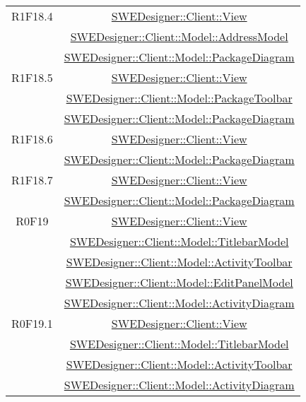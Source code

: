 \documentclass[../SpecificaTecnica.tex]{subfiles}
\begin{document}
\begin{longtable}{|c|c|}
		R1F18.4 & \hyperlink{SWEDesigner::Client::View}{SWEDesigner::Client::View} \\& \hyperlink{SWEDesigner::Client::Model::AddressModel}{SWEDesigner::Client::Model::AddressModel} \\& \hyperlink{SWEDesigner::Client::Model::PackageDiagram}{SWEDesigner::Client::Model::PackageDiagram}\\\hline
		R1F18.5 & \hyperlink{SWEDesigner::Client::View}{SWEDesigner::Client::View} \\& \hyperlink{SWEDesigner::Client::Model::PackageToolbar}{SWEDesigner::Client::Model::PackageToolbar} \\& \hyperlink{SWEDesigner::Client::Model::PackageDiagram}{SWEDesigner::Client::Model::PackageDiagram} \\\hline
		R1F18.6 & \hyperlink{SWEDesigner::Client::View}{SWEDesigner::Client::View} \\& \hyperlink{SWEDesigner::Client::Model::PackageDiagram}{SWEDesigner::Client::Model::PackageDiagram} \\\hline
		R1F18.7 & \hyperlink{SWEDesigner::Client::View}{SWEDesigner::Client::View} \\& \hyperlink{SWEDesigner::Client::Model::PackageDiagram}{SWEDesigner::Client::Model::PackageDiagram} \\\hline
		R0F19 & \hyperlink{SWEDesigner::Client::View}{SWEDesigner::Client::View} \\& \hyperlink{SWEDesigner::Client::Model::TitlebarModel}{SWEDesigner::Client::Model::TitlebarModel} \\& \hyperlink{SWEDesigner::Client::Model::ActivityToolbar}{SWEDesigner::Client::Model::ActivityToolbar} \\& \hyperlink{SWEDesigner::Client::Model::EditPanelModel}{SWEDesigner::Client::Model::EditPanelModel} \\& \hyperlink{SWEDesigner::Client::Model::ActivityDiagram}{SWEDesigner::Client::Model::ActivityDiagram}\\\hline
		R0F19.1 & \hyperlink{SWEDesigner::Client::View}{SWEDesigner::Client::View} \\& \hyperlink{SWEDesigner::Client::Model::TitlebarModel}{SWEDesigner::Client::Model::TitlebarModel} \\& \hyperlink{SWEDesigner::Client::Model::ActivityToolbar}{SWEDesigner::Client::Model::ActivityToolbar} \\& \hyperlink{SWEDesigner::Client::Model::ActivityDiagram}{SWEDesigner::Client::Model::ActivityDiagram}\\\hline

\end{longtable}
\end{document}
